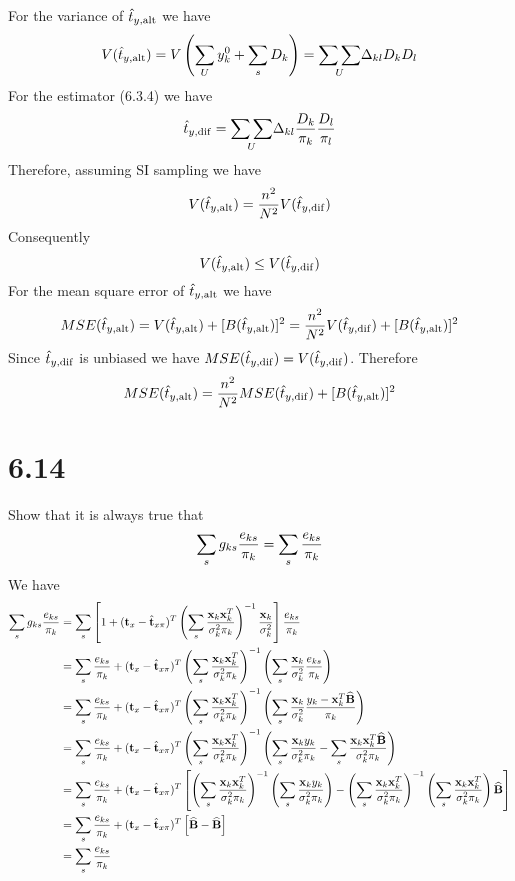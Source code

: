 \documentclass[12pt]{article}
\begin{document}
For the variance of $\hat t_{y,\rm alt}$ we have
\[
V(\hat t_{y,\rm alt})
=V\left(\sum_Uy_k^0+\sum_sD_k\right)
=\underset{U}{\sum\sum}\Delta_{kl}D_kD_l
\]
For the estimator (6.3.4) we have
\[
\hat t_{y,\rm dif}=\underset{U}{\sum\sum}\Delta_{kl}
{D_k\over\pi_k}{D_l\over\pi_l}
\]
Therefore, assuming SI sampling we have
\[
V(\hat t_{y,\rm alt})={n^2\over N^2}V(\hat t_{y,\rm dif})
\]
Consequently
\[
V(\hat t_{y,\rm alt})\le V(\hat t_{y,\rm dif})
\]
For the mean square error of $\hat t_{y,\rm alt}$ we have
\[
MSE(\hat t_{y,\rm alt})
=
V(\hat t_{y,\rm alt})+[B(\hat t_{y,\rm alt})]^2\\
=
{n^2\over N^2}V(\hat t_{y,\rm dif})+[B(\hat t_{y,\rm alt})]^2
\]
Since $\hat t_{y,\rm dif}$ is unbiased we have
$MSE(\hat t_{y,\rm dif})=V(\hat t_{y,\rm dif})$.
Therefore
\[
MSE(\hat t_{y,\rm alt})={n^2\over N^2}MSE(\hat t_{y,\rm dif})+[B(\hat t_{y,\rm alt})]^2
\]


\section*{6.14}
Show that it is always true that
\[
\sum_s g_{ks}{e_{ks}\over\pi_k}=\sum_s{e_{ks}\over\pi_k}
\]
We have
\begin{align*}
\sum_sg_{ks}{e_{ks}\over\pi_k}
&=
\sum_s\left[
1+(\mathbf t_x-\hat{\mathbf t}_{x\pi})^T
\left(
\sum_s{\mathbf x_k\mathbf x_k^T\over\sigma_k^2\pi_k}
\right)^{-1}
{\mathbf x_k\over\sigma_k^2}
\right]
{e_{ks}\over\pi_k}\\
%
&=
\sum_s{e_{ks}\over\pi_k}
+(\mathbf t_x-\hat{\mathbf t}_{x\pi})^T
\left(
\sum_s{\mathbf x_k\mathbf x_k^T\over\sigma_k^2\pi_k}
\right)^{-1}
\left(\sum_s{\mathbf x_k\over\sigma_k^2}{e_{ks}\over\pi_k}\right)\\
%
&=
\sum_s{e_{ks}\over\pi_k}
+(\mathbf t_x-\hat{\mathbf t}_{x\pi})^T
\left(
\sum_s{\mathbf x_k\mathbf x_k^T\over\sigma_k^2\pi_k}
\right)^{-1}
\left(\sum_s{\mathbf x_k\over\sigma_k^2}
{y_k-\mathbf x_k^T\widehat{\mathbf B}\over\pi_k}\right)\\
%
&=
\sum_s{e_{ks}\over\pi_k}
+(\mathbf t_x-\hat{\mathbf t}_{x\pi})^T
\left(
\sum_s{\mathbf x_k\mathbf x_k^T\over\sigma_k^2\pi_k}
\right)^{-1}
\left(
\sum_s{\mathbf x_ky_k\over\sigma_k^2\pi_k}
-\sum_s{\mathbf x_k\mathbf x_k^T\widehat{\mathbf B}\over\sigma_k^2\pi_k}
\right)\\
&=
\sum_s{e_{ks}\over\pi_k}
+(\mathbf t_x-\hat{\mathbf t}_{x\pi})^T
\left[
\left(
\sum_s{\mathbf x_k\mathbf x_k^T\over\sigma_k^2\pi_k}
\right)^{-1}
\left(\sum_s{\mathbf x_ky_k\over\sigma_k^2\pi_k}\right)
-\left(
\sum_s{\mathbf x_k\mathbf x_k^T\over\sigma_k^2\pi_k}
\right)^{-1}
\left(\sum_s{\mathbf x_k\mathbf x_k^T\over\sigma_k^2\pi_k}\right)
\widehat{\mathbf B}
\right]\\
&=
\sum_s{e_{ks}\over\pi_k}
+(\mathbf t_x-\hat{\mathbf t}_{x\pi})^T
\left[\widehat{\mathbf B}-\widehat{\mathbf B}\right]\\
&=
\sum_s{e_{ks}\over\pi_k}
\end{align*}
\end{document}
